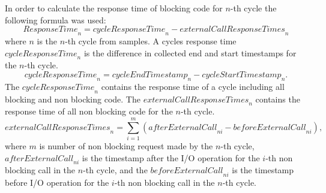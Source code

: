 In order to calculate the response time of blocking code for $n$-th cycle the following formula was used:
\[
\textit{ResponseTime}_n
=\textit{cycleResponseTime}_n - \textit{externalCallResponseTimes}_n
\]
where $n$ is the $n$-th cycle from samples.
A cycles response time $\textit{cycleResponseTime}_n$ is the difference in collected end and start timestamps for the $n$-th cycle.
\[
\textit{cycleResponseTime}_n=\textit{cycleEndTimestamp}_n - \textit{cycleStartTimestamp}_n
.\]
The $\textit{cycleResponseTime}_n$ contains the response time of a cycle including all blocking and non blocking code.
The $\textit{externalCallResponseTimes}_n$ contains the response time of all non blocking code for the $n$-th cycle.
\[
\textit{externalCallResponseTimes}_n = \sum_{i=1}^{\textit{m}} (\textit{afterExternalCall}_{ni} -     \textit{beforeExternalCall}_{ni})
,\] where $m$ is number of non blocking request made by the $n$-th cycle,
$\textit{afterExternalCall}_{ni}$ is the timestamp after the I/O operation for the $i$-th non blocking call in the $n$-th cycle, and the $\textit{beforeExternalCall}_{ni}$ is the timestamp before I/O operation for the $i$-th non blocking call in the $n$-th cycle.
